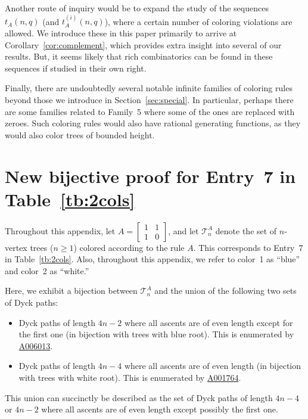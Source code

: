 \documentclass[12pt]{amsart}
\newcommand{\seqnum}[1]{\href{https://oeis.org/#1}{#1}}
\begin{document}
Another route of inquiry would be to expand the study of the sequences $t_A(n,q)$ (and $t_A^{(i)}(n,q)$), where a certain number of coloring violations are allowed. We introduce these in this paper primarily to arrive at Corollary~\ref{cor:complement}, which provides extra insight into several of our results. But, it seems likely that rich combinatorics can be found in these sequences if studied in their own right.

Finally, there are undoubtedly several notable infinite families of coloring rules beyond those we introduce in Section~\ref{sec:special}. In particular, perhaps there are some families related to Family~5 where some of the ones are replaced with zeroes. Such coloring rules would also have rational generating functions, as they would also color trees of bounded height.




\appendix

\section{New bijective proof for Entry~7 in Table~\ref{tb:2cols}}\label{app:ent7bij}
Throughout this appendix, let $A=\begin{bmatrix}
    1&1\\1&0
\end{bmatrix}$, and let $\mathcal{T}_n^{A}$ denote the set of $n$-vertex trees ($n\geq1$) colored according to the rule $A$. This corresponds to Entry~7 in Table~\ref{tb:2cols}. Also, throughout this appendix, we refer to color~1 as ``blue'' and color~2 as ``white.''

Here, we exhibit a bijection between $\mathcal{T}_n^{A}$ and the union of the following two sets of Dyck paths:
\begin{itemize}
    \item Dyck paths of length $4n-2$ where all ascents are of even length except for the first one (in bijection with trees with blue root). This is enumerated by \seqnum{A006013}. 
    \item Dyck paths of length $4n-4$ where all ascents are of even length (in bijection with trees with white root). This is enumerated by \seqnum{A001764}. 
\end{itemize}
This union can succinctly be described as the set of Dyck paths of length $4n-4$ or $4n-2$ where all ascents are of even length except possibly the first one.
\end{document}
